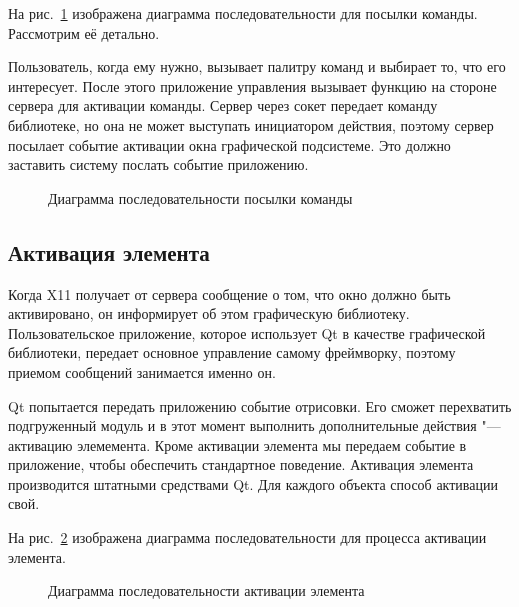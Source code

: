 На рис.~\ref{fig:send-command} изображена диаграмма последовательности для
посылки команды. Рассмотрим её детально.

Пользователь, когда ему нужно, вызывает палитру команд и выбирает то, что
его интересует. После этого приложение управления вызывает функцию на стороне
сервера для активации команды. Сервер через сокет передает команду библиотеке,
но она не может выступать инициатором действия, поэтому сервер посылает событие
активации окна графической подсистеме. Это должно заставить систему послать
событие приложению.

\begin{figure}[h]
	\centering
	
	\caption{Диаграмма последовательности посылки
		команды}\label{fig:send-command}
\end{figure}

\subsection{Активация элемента}

Когда X11 получает от сервера сообщение о том, что окно должно быть
активировано, он информирует об этом графическую библиотеку. Пользовательское
приложение, которое использует Qt в качестве графической библиотеки,
передает основное управление самому фреймворку, поэтому приемом сообщений
занимается именно он.

Qt попытается передать приложению событие отрисовки. Его сможет перехватить
подгруженный модуль и в этот момент выполнить дополнительные действия "---
активацию элемемента. Кроме активации элемента мы передаем событие в
приложение, чтобы обеспечить стандартное поведение. Активация элемента
производится штатными средствами Qt. Для каждого объекта способ активации
свой.

На рис.~\ref{fig:activate-elem} изображена диаграмма последовательности для
процесса активации элемента.

\begin{figure}[h]
	\centering
	
	\caption{Диаграмма последовательности активации
		элемента}\label{fig:activate-elem}
\end{figure}

